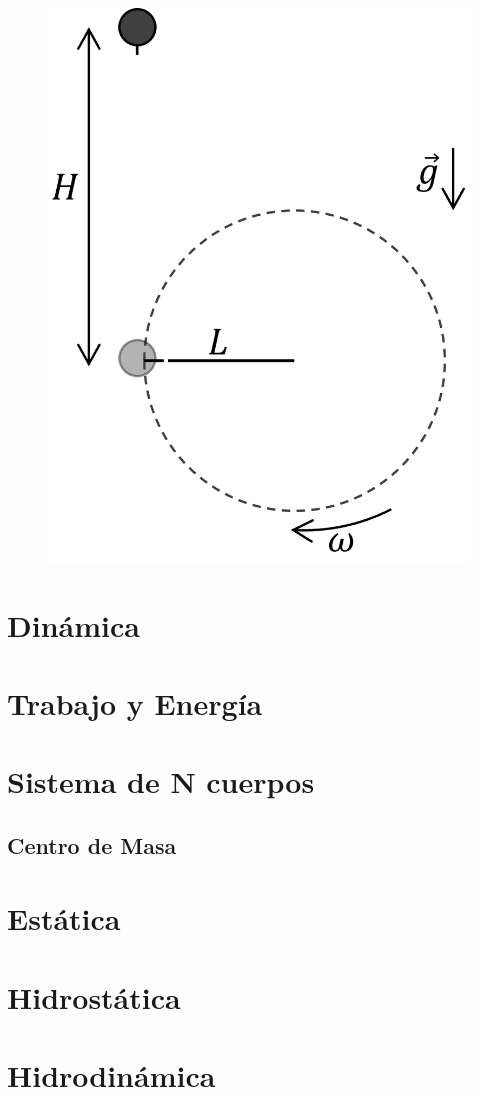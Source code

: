\documentclass[letterpaper,11pt]{article}
\begin{document}
\begin{enumerate}
\begin{multicols}{2}
\begin{enumerate}
    \end{enumerate}

    \columnbreak

    \begin{figure}[H]
        \centering
        \includegraphics[width=0.45\linewidth]{2023-1/img/TD 2/piedra.png}
    \end{figure}
    
\end{multicols}


\section*{Dinámica}

\section*{Trabajo y Energía}

\section*{Sistema de N cuerpos}
\subsection*{Centro de Masa}

\section*{Estática}

\section*{Hidrostática}

\section*{Hidrodinámica}



%   

\end{enumerate}
\end{document}

